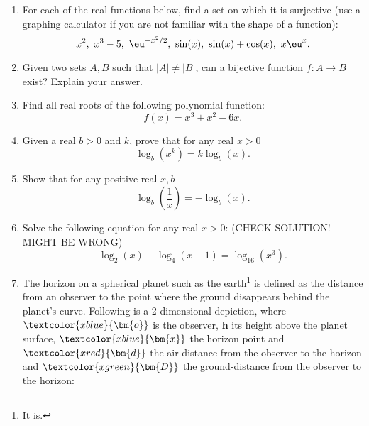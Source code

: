 \begin{enumerate}
	\item For each of the real functions below, find a set on which it is surjective (use a graphing calculator if you are not familiar with the shape of a function):
		\[
			x^{2},\ x^{3}-5,\ \eu^{-x^{2}/2},\ \sin(x),\ \sin(x)+\cos(x),\ x\eu^{x}.
		\]

	\item Given two sets $A,B$ such that $|A|\neq|B|$, can a bijective function $f:A\to B$ exist? Explain your answer.

	\item Find all real roots of the following polynomial function:
		\[
			f(x) = x^{3} + x^{2} - 6x.
		\]

	\item Given a real $b>0$ and $k$, prove that for any real $x>0$
		\[
			\log_{b} \left( x^{k} \right) = k\log_{b} \left( x \right).
		\]

	\item Show that for any positive real $x,b$
		\[
			\log_{b} \left( \frac{1}{x} \right) = -\log_{b}(x).
		\]

	\item Solve the following equation for any real $x>0$: (CHECK SOLUTION! MIGHT BE WRONG)
		\[
			\log_{2}(x) + \log_{4}(x-1) = \log_{16}\left(x^{3}\right).
		\]

	\item The horizon on a spherical planet such as the earth\footnote{It is.} is defined as the distance from an observer to the point where the ground disappears behind the planet's curve. Following is a 2-dimensional depiction, where $\textcolor{xblue}{\bm{o}}$ is the observer, $\bm{h}$ its height above the planet surface, $\textcolor{xblue}{\bm{x}}$ the horizon point and $\textcolor{xred}{\bm{d}}$ the air-distance from the observer to the horizon and $\textcolor{xgreen}{\bm{D}}$ the ground-distance from the observer to the horizon:

		\begin{center}
		\end{center}


\end{enumerate}
